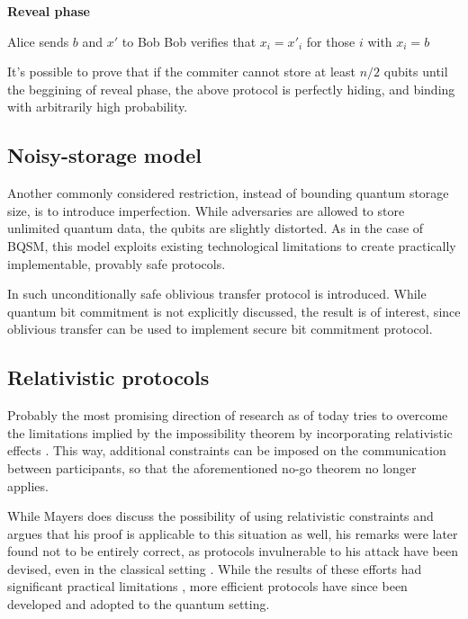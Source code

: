 \documentclass[10pt]{article}
\begin{document}
\NoCaptionOfAlgo
\begin{algorithm}[H]
\caption{\textbf{Reveal phase}}
Alice sends \(b\) and \(x'\) to Bob \;
Bob verifies that \(x_i=x'_i\) for those \(i\) with \(x_i=b\)
\end{algorithm}

It's possible to prove that if the commiter cannot store at least \(n/2\) qubits until the beggining
of reveal phase, the above protocol is perfectly hiding, and binding with arbitrarily high probability.


\subsection{Noisy-storage model}

Another commonly considered restriction, instead of bounding quantum storage size, is to introduce
imperfection. While adversaries are allowed to store unlimited quantum data, the qubits are slightly
distorted. As in the case of BQSM, this model exploits existing technological limitations to create
practically implementable, provably safe protocols.

In \cite{Wehner08} such unconditionally safe oblivious transfer protocol is introduced. While
quantum bit commitment is not explicitly discussed, the result is of interest, since oblivious
transfer can be used to implement secure bit commitment protocol.

\subsection{Relativistic protocols}

Probably the most promising direction of research as of today tries to overcome the limitations
implied by the impossibility theorem by incorporating relativistic effects \cite{Kent99}. This way,
additional constraints can be imposed on the communication between participants, so that the 
aforementioned no-go theorem no longer applies.

While Mayers \cite{Mayers97} does discuss the possibility of using relativistic constraints and argues 
that his proof is applicable to this situation as well, his remarks were later found not to be entirely
correct, as protocols invulnerable to his attack have been devised, even in the classical setting
\cite{Kent99}. While the results of these efforts had significant practical limitations \footnotemark,
more efficient protocols have since been developed \cite{Kent05} and adopted to the quantum setting.
\end{document}
